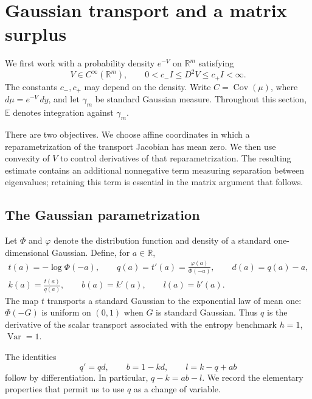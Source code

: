 \section{Gaussian transport and a matrix surplus}\label{tr:section}

We first work with a probability density $e^{-V}$ on $\mathbb R^m$ satisfying
\begin{equation}\label{tr:smooth-assumptions}
 V\in C^\infty(\mathbb R^m),\qquad
 0<c_- I\le D^2V\le c_+I<\infty.
\end{equation}
The constants $c_-,c_+$ may depend on the density.  Write
$C=\operatorname{Cov}(\mu)$, where $d\mu=e^{-V}\,dy$, and let
$\gamma_m$ be standard Gaussian measure.  Throughout this section,
$\mathbb E$ denotes integration against $\gamma_m$.

There are two objectives.  We choose affine coordinates in which a
reparametrization of the transport Jacobian has mean zero.  We then use
convexity of $V$ to control derivatives of that reparametrization.  The
resulting estimate contains an additional nonnegative term measuring
separation between eigenvalues; retaining this term is essential in the
matrix argument that follows.

\subsection{The Gaussian parametrization}

Let $\Phi$ and $\varphi$ denote the distribution function and density of a
standard one-dimensional Gaussian.  Define, for $a\in\mathbb R$,
\begin{equation}\label{tr:scalar-functions}
 \begin{gathered}
 t(a)=-\log\Phi(-a),\qquad q(a)=t'(a)=\frac{\varphi(a)}{\Phi(-a)},
 \qquad d(a)=q(a)-a,\\
 k(a)=\frac{t(a)}{q(a)},\qquad b(a)=k'(a),\qquad l(a)=b'(a).
 \end{gathered}
\end{equation}
The map $t$ transports a standard Gaussian to the exponential law of
mean one: $\Phi(-G)$ is uniform on $(0,1)$ when $G$ is standard Gaussian.
Thus $q$ is the derivative of the scalar transport associated with the
entropy benchmark $h=1$, $\operatorname{Var}=1$.

The identities
\begin{equation}\label{tr:scalar-identities}
 q'=qd,\qquad b=1-kd,\qquad l=k-q+ab
\end{equation}
follow by differentiation.  In particular, $q-k=ab-l$.  We record the
elementary properties that permit us to use $q$ as a change of variable.

